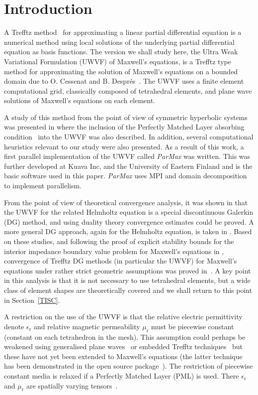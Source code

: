 \documentclass[a4paper,12pt]{article}
\newcommand{\epsr}{\epsilon_{\mathrm{r}}}
\newcommand{\mur}{\mu_{\mathrm{r}}}
\begin{document}
\newpage

\section{Introduction}

A Trefftz method~\cite{Trefftz26} for approximating a linear partial
differential equation is a numerical method using local solutions of
the underlying partial differential equation as basis functions.  The
version we shall study here, the Ultra Weak Variational Formulation
(UWVF) of Maxwell's equations, is a Trefftz type method for
approximating the solution of Maxwell's equations on a bounded domain
due to O. Cessenat and B. Despr\'es~\cite{cessenat_phd,cessenat03}.
The UWVF uses a finite element computational grid, classically
composed of tetrahedral elements, and plane wave solutions of
Maxwell's equations on each element.

A study of this method from the point of view of symmetric hyperbolic
systems was presented in \cite{Huttunen2007} where the inclusion of
the Perfectly Matched Layer absorbing condition~\cite{Berenger} into
the UWVF was also described.  In addition, several computational
heuristics relevant to our study were also presented.  As a result of
this work, a first parallel implementation of the UWVF called
\emph{ParMax} was written.  This was further developed at Kuava Inc,
and the University of Eastern Finland and is the basic software used
in this paper.  \emph{ParMax} uses MPI and domain decomposition to
implement parallelism.

From the point of view of theoretical convergence analysis, it was
shown in \cite{buf07} that the UWVF for the related Helmholtz equation
is a special discontinuous Galerkin (DG) method, and using duality
theory convergence estimates could be proved.  A more general DG
approach, again for the Helmholtz equation, is taken in \cite{git07}.
Based on these studies, and following the proof of explicit stability
bounds for the interior impedance boundary value problem for Maxwell's
equations in \cite{moi11}, convergence of Trefftz DG methods (in
particular the UWVF) for Maxwell's equations under rather strict
geometric assumptions was proved in~\cite{HMP13}.  A key point in this
analysis is that it is not necessary to use tetrahedral elements, but
a wide class of element shapes are theoretically covered and we shall
return to this point in Section~\ref{TISC}.

A restriction on the use of the UWVF is that the relative electric
permittivity denote $\epsr$ and relative magnetic permeability $\mur$
must be piecewise constant (constant on each tetrahedron in the
mesh). This assumption could perhaps be weakened using generalised
plane waves~\cite{IM-sylvand-21} or embedded Trefftz
techniques~\cite{PS_22} but these have not yet been extended to
Maxwell's equations (the latter technique has been demonstrated in the
open source package~\cite{NGSTrefftz}).  The restriction of piecewise
constant media is relaxed if a Perfectly Matched Layer (PML) is used.
There $\epsr$ and $\mur$ are spatially varying
tensors~\cite{Huttunen2007}.
\end{document}
